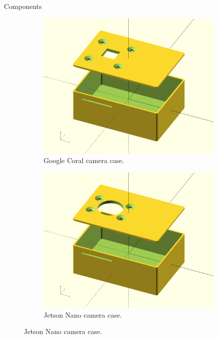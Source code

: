 \documentclass[final, 20pt]{beamer}
\newlength{\colwidth}
\begin{document}
\begin{frame}[t]
\begin{columns}[t]
\begin{column}{\colwidth}
\begin{alertblock}{Components}
\begin{figure}
      \begin{subfigure}[b]{0.33\textwidth}
        \includegraphics[width=\textwidth]{coral_case.png}
        \caption*{Google Coral camera case.}
      \end{subfigure}
      \hspace{1cm}
      \begin{subfigure}[b]{0.33\textwidth}
        \includegraphics[width=\textwidth]{nano_case.png}
        \caption*{Jetson Nano camera case.}
      \end{subfigure}
    \end{figure}
  \end{alertblock}


\end{column}
\end{columns}
\end{frame}
\end{document}
